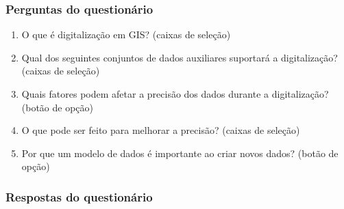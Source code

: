 \documentclass[
  portuguese,
]{krantz}
\providecommand{\tightlist}{%
  \setlength{\itemsep}{0pt}\setlength{\parskip}{0pt}}
\begin{document}
\hypertarget{perguntas-do-questionuxe1rio-14}{%
\subsubsection{\texorpdfstring{\textbf{Perguntas do questionário}}{Perguntas do questionário}}\label{perguntas-do-questionuxe1rio-14}}

\begin{enumerate}
\def\labelenumi{\arabic{enumi}.}
\tightlist
\item
  O que é digitalização em GIS? (caixas de seleção)
\item
  Qual dos seguintes conjuntos de dados auxiliares suportará a digitalização? (caixas de seleção)
\item
  Quais fatores podem afetar a precisão dos dados durante a digitalização? (botão de opção)
\item
  O que pode ser feito para melhorar a precisão? (caixas de seleção)
\item
  Por que um modelo de dados é importante ao criar novos dados? (botão de opção)
\end{enumerate}

\hypertarget{respostas-do-questionuxe1rio-5}{%
\subsubsection{Respostas do questionário}\label{respostas-do-questionuxe1rio-5}}
\end{document}
